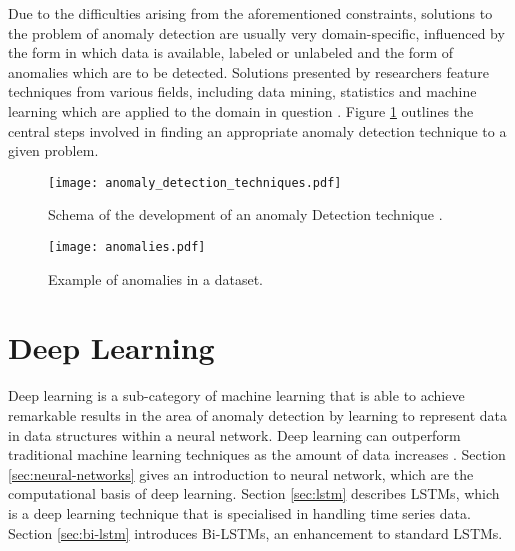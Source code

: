 Due to the difficulties arising from the aforementioned constraints, solutions to the problem of anomaly detection are usually very domain-specific, influenced by the form in which data is available, labeled or unlabeled and the form of anomalies which are to be detected. Solutions presented by researchers feature techniques from various fields, including data mining, statistics and machine learning which are applied to the domain in question \cite{chandola2009anomaly}. Figure \ref{fig:anomaly_technique} outlines the central steps involved in finding an appropriate anomaly detection technique to a given problem.


\begin{figure}[h]
  \centering
\texttt{[image: anomaly\_detection\_techniques.pdf]}\\ 
  \caption{Schema of the development of an anomaly Detection technique \cite{chandola2009anomaly}.}
  \label{fig:anomaly_technique}
\end{figure}

\begin{figure}[h]
  \centering
  \texttt{[image: anomalies.pdf]}\\
  \caption{Example of anomalies in a dataset.}
  \label{fig:anomaly_dataset}
\end{figure}




\section{Deep Learning \label{sec:deep-learning}}
Deep learning is a sub-category of machine learning that is able to achieve remarkable results in the area of anomaly detection by learning to represent data in data structures within a neural network. Deep learning can outperform traditional machine learning techniques as the amount of data increases \cite{chalapathy2019deep}. Section \ref{sec:neural-networks} gives an introduction to neural network, which are the computational basis of deep learning. Section \ref{sec:lstm} describes LSTMs, which is a deep learning technique that is specialised in handling time series data. Section \ref{sec:bi-lstm} introduces Bi-LSTMs, an enhancement to standard LSTMs.
